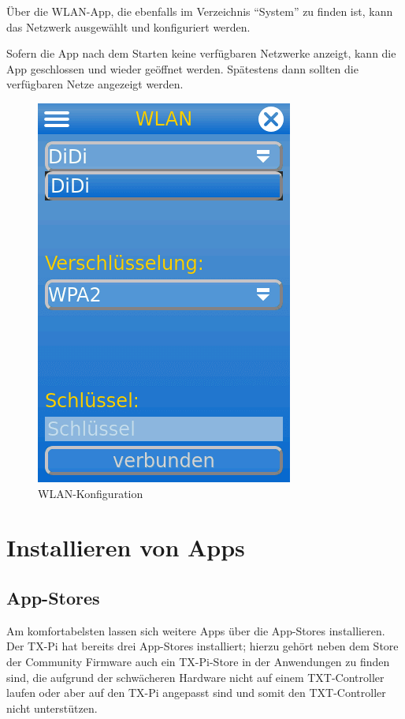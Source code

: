 \documentclass[
  paper=A4,
  ngerman,
  fontsize=12pt,
  parskip=half-,
]{scrbook}
\begin{document}
Über die WLAN-App, die ebenfalls im Verzeichnis "`System"' zu finden ist, kann das
Netzwerk ausgewählt und konfiguriert werden.

Sofern die App nach dem Starten keine verfügbaren Netzwerke anzeigt, kann die App
geschlossen und wieder geöffnet werden. Spätestens dann sollten die verfügbaren
Netze angezeigt werden.

\begin{figure}[ht]
\centering
\includegraphics[scale=0.4]{images/wlan.png}
\caption{WLAN-Konfiguration}
\end{figure}


\chapter{Installieren von Apps}

\section{App-Stores}

Am komfortabelsten lassen sich weitere Apps über die App-Stores
installieren. Der TX-Pi hat bereits drei App-Stores installiert;
hierzu gehört neben dem Store der Community Firmware auch ein 
TX-Pi-Store in der Anwendungen zu finden sind, die aufgrund
der schwächeren Hardware nicht auf einem TXT-Controller laufen
oder aber auf den TX-Pi angepasst sind und somit den TXT-Controller
nicht unterstützen.
\end{document}
